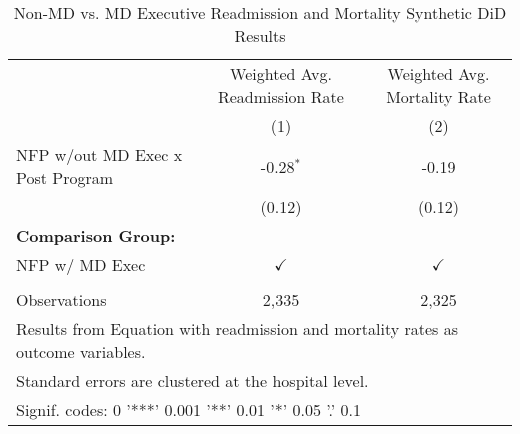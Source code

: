 \begin{table}[ht!]

\caption{\label{tab:MD_noMD_readmort_synth}Non-MD vs. MD Executive Readmission and Mortality Synthetic DiD Results}
\centering
\begin{tabular}[t]{lcc}
\toprule
\multicolumn{1}{c}{ } & \multicolumn{1}{c}{Weighted Avg. Readmission Rate} & \multicolumn{1}{c}{Weighted Avg. Mortality Rate} \\
 & (1) & (2)\\
\midrule
NFP w/out MD Exec x Post Program & -0.28$^{*}$ & -0.19\\
 & (0.12) & (0.12)\\
\textbf{Comparison Group:} &  & \\
NFP w/ MD Exec & $\checkmark$ & $\checkmark$\\
 &  & \\
\addlinespace
Observations & 2,335 & 2,325\\
\bottomrule
\multicolumn{3}{l}{\textsuperscript{} Results from Equation with readmission and mortality rates as outcome variables.}\\
\multicolumn{3}{l}{\textsuperscript{} Standard errors are clustered at the hospital level.}\\
\multicolumn{3}{l}{\textsuperscript{} Signif. codes: 0 '***' 0.001 '**' 0.01 '*' 0.05 '.' 0.1}\\
\end{tabular}
\end{table}
